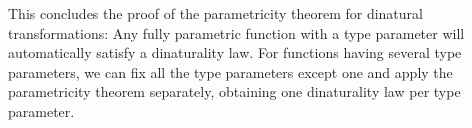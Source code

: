 This concludes the proof of the parametricity theorem for dinatural
transformations: Any fully parametric function with a type parameter
will automatically satisfy a dinaturality law. For functions having
several type parameters, we can fix all the type parameters except
one and apply the parametricity theorem separately, obtaining one
dinaturality law per type parameter.

\begin{comment}
A failed attempt to derive the strong dinaturality law of $t$ from
that of $u$ and $v$: 

The strong dinaturality law of $t$ says that, for any $f^{:A\rightarrow B}$,
\[
\text{when}\quad x^{:P^{A,A}}\triangleright f^{\uparrow P^{A,\bullet}}=y^{:P^{B,B}}\triangleright f^{\downarrow P^{\bullet,B}}\text{ then}\quad x\triangleright t\triangleright f^{\uparrow Q^{A,\bullet}}\overset{?}{=}y\triangleright t\triangleright f^{\downarrow Q^{\bullet,B}}\quad.
\]
Substituting the definition $t\triangleq p\rightarrow v(p)\triangleright u(p)$
and dropping some type annotations, we rewrite it as
\[
\text{when}\quad x^{:P^{A,A}}\triangleright f^{\uparrow P}=y^{:P^{B,B}}\triangleright f^{\downarrow P}\text{ then}\quad v(x)\triangleright u(x)\bef f^{\uparrow Q}\overset{?}{=}v(y)\triangleright u(y)\bef f^{\downarrow Q}\quad.
\]
The preconditions of the strong dinaturality laws of $u$ and $v$
are the same, and their conclusions are
\[
v(x)\triangleright f^{\uparrow Z}\overset{!}{=}v(y)\triangleright f^{\downarrow Z}\quad\text{ and }\quad u(x)\triangleright f^{\uparrow G}\overset{!}{=}u(y)\triangleright f^{\downarrow G}\quad.
\]
We used the symbol $\overset{!}{=}$ since these laws are assumed
to hold. With the code for liftings to $G$,
\[
f^{\uparrow G}=q^{:G^{A,A}}\rightarrow f^{\downarrow Z}\bef q\bef f^{\uparrow Q}\quad,\quad\quad f^{\downarrow G}=q^{:G^{B,B}}\rightarrow f^{\uparrow Z}\bef q\bef f^{\downarrow Q}\quad,
\]
we rewrite the conclusion of the strong dinaturality law of $u$ as
\[
u(x)\triangleright f^{\uparrow G}=f^{\downarrow Z}\bef u(x)\bef f^{\uparrow Q}\overset{!}{=}u(y)\triangleright f^{\downarrow G}=f^{\uparrow Z}\bef u(y)\bef f^{\downarrow Q}\quad.
\]
Now we are ready to start with the left-hand side of the strong dinaturality
law of $t$:
\begin{align*}
{\color{greenunder}\text{left-hand side}:}\quad & \quad v(x)\triangleright u(x)\bef f^{\uparrow Q}=
\end{align*}
We cannot insert $f^{\uparrow Z}$ or $f^{\downarrow Z}$ into this
expression, so we can't use the assumptions about $u$ and $v$.
\end{comment}

